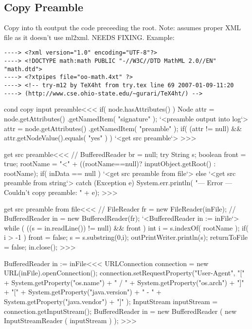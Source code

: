 \documentclass{article}
\begin{document}
{%
\subsection{Copy Preamble}


Copy into th eoutput the code preceeding the root. Note: assumes proper
XML file as it doesn't use ml2xml. NEEDS FIXING.
Example:

\begin{verbatim}
----> <?xml version="1.0" encoding="UTF-8"?>
----> <!DOCTYPE math:math PUBLIC "-//W3C//DTD MathML 2.0//EN" "math.dtd">
----> <?xtpipes file="oo-math.4xt" ?>
----> <!-- try-m12 by TeX4ht from try.tex line 69 2007-01-09-11:20
----> (http://www.cse.ohio-state.edu/~gurari/TeX4ht/) -->
\end{verbatim}



\<cond copy input preamble\><<<
if( node.hasAttributes() ){
   Node attr = node.getAttributes()
                   .getNamedItem( "signature" );
   `<preamble output into log`>
   attr = node.getAttributes()
                   .getNamedItem( "preamble" );
   if( (attr != null)
       && attr.getNodeValue().equals( "yes" ) ){
      `<get src preamble`>
} }
>>>


\<get src preamble\><<<
// BufferedReader br = null;
try {
   String s;
   boolean front = true;
   rootName = "<" + ((rootName==null)? inputObject.getRoot() : rootName);
   if( inData == null ){
      `<get src preamble from file`>
   } else {
      `<get src preamble from string`>
   }
} catch (Exception e) {
   System.err.println(
        "--- Error --- Couldn't copy preamble: " + e);
}
>>>




\<get src preamble from file\><<<
// FileReader fr = new FileReader(inFile);
// BufferedReader in = new BufferedReader(fr);
`<BufferedReader in := inFile`>
while (  ((s = in.readLine()) != null) && front ) {
   int i = s.indexOf( rootName );
   if( i > -1 ){
      front = false;
      s = s.substring(0,i);
   }
   outPrintWriter.println(s);
   returnToFile = false;
}
in.close();
>>>

\<BufferedReader in := inFile\><<<
URLConnection connection =
             new URL(inFile).openConnection();
connection.setRequestProperty("User-Agent",
                "["
              + System.getProperty("os.name")
              + " / "
              + System.getProperty("os.arch")
              + "]"
              + "["
              + System.getProperty("java.version")
              + " - "
              + System.getProperty("java.vendor")
              + "]"
);
InputStream inputStream = connection.getInputStream();
BufferedReader in = new BufferedReader (
                        new InputStreamReader ( inputStream ) );
>>>






}
\end{document}
